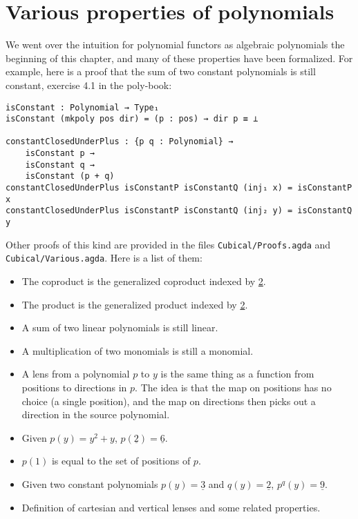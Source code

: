 \section{Various properties of polynomials}

We went over the intuition for polynomial functors as algebraic polynomials the beginning of this chapter, and many of these properties have been formalized. For example, here is a proof that the sum of two constant polynomials is still constant, exercise 4.1 in the poly-book:

\begin{verbatim}
isConstant : Polynomial → Type₁
isConstant (mkpoly pos dir) = (p : pos) → dir p ≡ ⊥

constantClosedUnderPlus : {p q : Polynomial} → 
    isConstant p → 
    isConstant q → 
    isConstant (p + q)
constantClosedUnderPlus isConstantP isConstantQ (inj₁ x) = isConstantP x
constantClosedUnderPlus isConstantP isConstantQ (inj₂ y) = isConstantQ y
\end{verbatim}

Other proofs of this kind are provided in the files \texttt{Cubical/Proofs.agda} and 
\texttt{Cubical/Various.agda}. Here is a list of them:
\begin{itemize}
    \item The coproduct is the generalized coproduct indexed by \underline{2}.
    \item The product is the generalized product indexed by \underline{2}.
    \item A sum of two linear polynomials is still linear.
    \item A multiplication of two monomials is still a monomial.
    \item A lens from a polynomial $p$ to $y$ is the same thing as a function from positions to directions in $p$. The idea is that the map on positions has no choice (a single position), and the map on directions then picks out a direction in the source polynomial.
    \item Given $p(y) = y^2 + y$, $p(\underline{2}) = \underline{6}$.
    \item $p(1)$ is equal to the set of positions of $p$.
    \item Given two constant polynomials $p(y) = \underline{3}$ and $q(y) = \underline{2}$, $p^q(y) = \underline{9}$.
    \item Definition of cartesian and vertical lenses and some related properties.
\end{itemize}
